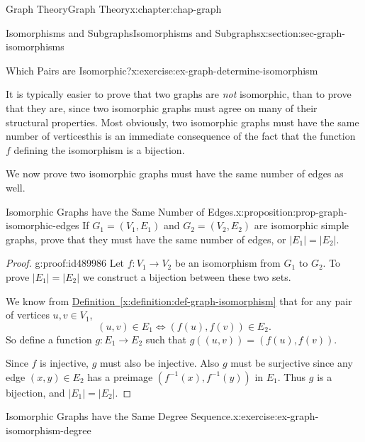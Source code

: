 \documentclass[oneside,10pt,]{book}
\newcommand{\xreffont}{\relax}
\numberwithin{equation}{section}
\begin{document}
\begin{chapterptx}{Graph Theory}{}{Graph Theory}{}{}{x:chapter:chap-graph}
\begin{sectionptx}{Isomorphisms and Subgraphs}{}{Isomorphisms and Subgraphs}{}{}{x:section:sec-graph-isomorphisms}
\begin{inlineexercise}{Which Pairs are Isomorphic?}{x:exercise:ex-graph-determine-isomorphism}
\begin{sidebyside}{2}{0.0425}{0.0425}{0.085}
\begin{sbspanel}{0.23}
{
}%
\end{sbspanel}%
\end{sidebyside}%
\end{inlineexercise}
It is typically easier to prove that two graphs are \emph{not} isomorphic, than to prove that they are, since two isomorphic graphs must agree on many of their structural properties. Most obviously, two isomorphic graphs must have the same number of vertices\textemdash{}this is an immediate consequence of the fact that the function \(f\) defining the isomorphism is a bijection.%
\par
We now prove two isomorphic graphs must have the same number of edges as well.%
\begin{proposition}{Isomorphic Graphs have the Same Number of Edges.}{}{x:proposition:prop-graph-isomorphic-edges}%
If \(G_1 = (V_1,E_1)\) and \(G_2 = (V_2,E_2)\) are isomorphic simple graphs, prove that they must have the same number of edges, or \(|E_1| = |E_2|\).%
\end{proposition}
\begin{proof}{}{g:proof:id489986}
Let \(f: V_1 \rightarrow V_2\) be an isomorphism from \(G_1\) to \(G_2\). To prove \(|E_1| = |E_2|\) we construct a bijection between these two sets.%
\par
We know from \hyperref[x:definition:def-graph-isomorphism]{Definition~{\xreffont\ref{x:definition:def-graph-isomorphism}}} that for any pair of vertices \(u,v \in V_1\),%
\begin{equation*}
(u,v) \in E_1 \Leftrightarrow (f(u),f(v)) \in E_2\text{.}
\end{equation*}
So define a function \(g: E_1 \rightarrow E_2\) such that \(g\left( (u,v) \right) = \left( f(u),f(v)\right)\).%
\par
Since \(f\) is injective, \(g\) must also be injective. Also \(g\) must be surjective since any edge \((x,y) \in E_2\) has a preimage \((f^{-1}(x),f^{-1}(y))\) in \(E_1\). Thus \(g\) is a bijection, and \(|E_1| = |E_2|\).%
\end{proof}
\begin{inlineexercise}{Isomorphic Graphs have the Same Degree Sequence.}{x:exercise:ex-graph-isomorphism-degree}%

\end{inlineexercise}
\end{sectionptx}
\end{chapterptx}
\end{document}
